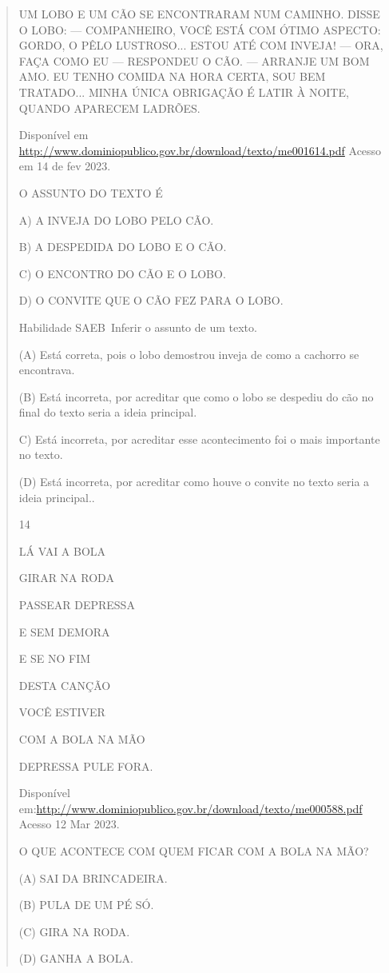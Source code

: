 {{{{\begin{verse}
{{\begin{escolha}
{{{{{UM LOBO E UM CÃO SE ENCONTRARAM NUM CAMINHO. DISSE O LOBO: ---
COMPANHEIRO, VOCÊ ESTÁ COM ÓTIMO ASPECTO: GORDO, O PÊLO LUSTROSO...
ESTOU ATÉ COM INVEJA! --- ORA, FAÇA COMO EU --- RESPONDEU O CÃO. ---
ARRANJE UM BOM AMO. EU TENHO COMIDA NA HORA CERTA, SOU BEM TRATADO...
MINHA ÚNICA OBRIGAÇÃO É LATIR À NOITE, QUANDO APARECEM LADRÕES.

\protect\hypertarget{_Hlk127335746}{}{}Disponível em
\url{http://www.dominiopublico.gov.br/download/texto/me001614.pdf}
Acesso em 14 de fev 2023.

O ASSUNTO DO TEXTO É

A) A INVEJA DO LOBO PELO CÃO.

B) A DESPEDIDA DO LOBO E O CÃO.

C) O ENCONTRO DO CÃO E O LOBO.

D) O CONVITE QUE O CÃO FEZ PARA O LOBO.

\protect\hypertarget{_Hlk127253071}{}{\protect\hypertarget{_Hlk127335662}{}{}}Habilidade
SAEB~Inferir o assunto de um texto.

(A) Está correta, pois o lobo demostrou inveja de como a cachorro se
encontrava.

(B) Está incorreta, por acreditar que como o lobo se despediu do cão no
final do texto seria a ideia principal.

C) Está incorreta, por acreditar esse acontecimento foi o mais
importante no texto.

(D) Está incorreta, por acreditar como houve o convite no texto seria a
ideia principal..

\num{14}

LÁ VAI A BOLA

GIRAR NA RODA

PASSEAR DEPRESSA

E SEM DEMORA

E SE NO FIM

DESTA CANÇÃO

VOCÊ ESTIVER

COM A BOLA NA MÃO

DEPRESSA PULE FORA.

Disponível
em:\url{http://www.dominiopublico.gov.br/download/texto/me000588.pdf}
Acesso 12 Mar 2023.

O QUE ACONTECE COM QUEM FICAR COM A BOLA NA MÃO?

(A) SAI DA BRINCADEIRA.

(B) PULA DE UM PÉ SÓ.

(C) GIRA NA RODA.

(D) GANHA A BOLA.

}}}}}
\end{escolha}}}
\end{verse}}}}}
